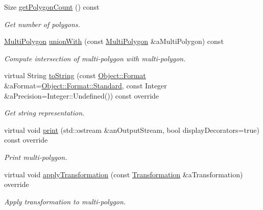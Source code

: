 \begin{DoxyCompactItemize}
Size \hyperlink{classlibrary_1_1math_1_1geom_1_1d2_1_1objects_1_1_multi_polygon_ac2a7a8791732ddd249a2bee8d476b7ae}{get\+Polygon\+Count} () const
\begin{DoxyCompactList}\small\item\em Get number of polygons. \end{DoxyCompactList}\item 
\hyperlink{classlibrary_1_1math_1_1geom_1_1d2_1_1objects_1_1_multi_polygon}{Multi\+Polygon} \hyperlink{classlibrary_1_1math_1_1geom_1_1d2_1_1objects_1_1_multi_polygon_ad27159b10d8cb05d9ed15f1dd2d3de1d}{union\+With} (const \hyperlink{classlibrary_1_1math_1_1geom_1_1d2_1_1objects_1_1_multi_polygon}{Multi\+Polygon} \&a\+Multi\+Polygon) const
\begin{DoxyCompactList}\small\item\em Compute intersection of multi-\/polygon with multi-\/polygon. \end{DoxyCompactList}\item 
virtual String \hyperlink{classlibrary_1_1math_1_1geom_1_1d2_1_1objects_1_1_multi_polygon_a598e024d69ca9a99d97cf7412b334869}{to\+String} (const \hyperlink{classlibrary_1_1math_1_1geom_1_1d2_1_1_object_ac8cd61dada4960cfee9a469231621b17}{Object\+::\+Format} \&a\+Format=\hyperlink{classlibrary_1_1math_1_1geom_1_1d2_1_1_object_ac8cd61dada4960cfee9a469231621b17aeb6d8ae6f20283755b339c0dc273988b}{Object\+::\+Format\+::\+Standard}, const Integer \&a\+Precision=Integer\+::\+Undefined()) const override
\begin{DoxyCompactList}\small\item\em Get string representation. \end{DoxyCompactList}\item 
virtual void \hyperlink{classlibrary_1_1math_1_1geom_1_1d2_1_1objects_1_1_multi_polygon_aa1998e9d86d24edb61e978f397148d1c}{print} (std\+::ostream \&an\+Output\+Stream, bool display\+Decorators=true) const override
\begin{DoxyCompactList}\small\item\em Print multi-\/polygon. \end{DoxyCompactList}\item 
virtual void \hyperlink{classlibrary_1_1math_1_1geom_1_1d2_1_1objects_1_1_multi_polygon_af4adcde904edd77d54236517652e4da1}{apply\+Transformation} (const \hyperlink{classlibrary_1_1math_1_1geom_1_1d2_1_1_transformation}{Transformation} \&a\+Transformation) override
\begin{DoxyCompactList}\small\item\em Apply transformation to multi-\/polygon. \end{DoxyCompactList}\end{DoxyCompactItemize}
